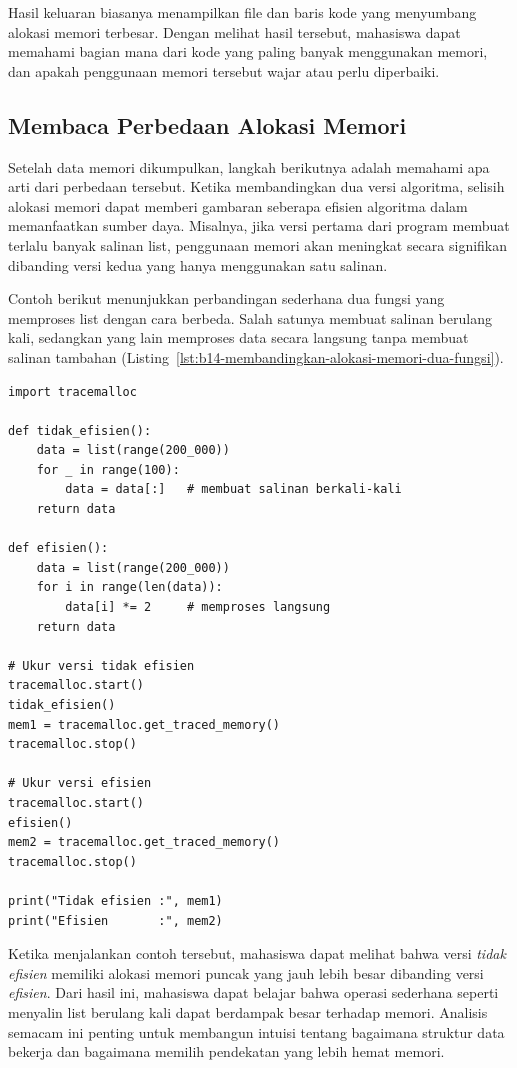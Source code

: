 Hasil keluaran biasanya menampilkan file dan baris kode yang menyumbang alokasi memori terbesar. Dengan melihat hasil tersebut, mahasiswa dapat memahami bagian mana dari kode yang paling banyak menggunakan memori, dan apakah penggunaan memori tersebut wajar atau perlu diperbaiki.

\subsection{Membaca Perbedaan Alokasi Memori}

Setelah data memori dikumpulkan, langkah berikutnya adalah memahami apa arti dari perbedaan tersebut. Ketika membandingkan dua versi algoritma, selisih alokasi memori dapat memberi gambaran seberapa efisien algoritma dalam memanfaatkan sumber daya. Misalnya, jika versi pertama dari program membuat terlalu banyak salinan list, penggunaan memori akan meningkat secara signifikan dibanding versi kedua yang hanya menggunakan satu salinan.

Contoh berikut menunjukkan perbandingan sederhana dua fungsi yang memproses list dengan cara berbeda. Salah satunya membuat salinan berulang kali, sedangkan yang lain memproses data secara langsung tanpa membuat salinan tambahan (Listing~\ref{lst:b14-membandingkan-alokasi-memori-dua-fungsi}).

\begin{lstlisting}[style=PythonStyle, caption={Membandingkan alokasi memori dua fungsi}, label={lst:b14-membandingkan-alokasi-memori-dua-fungsi}]
import tracemalloc

def tidak_efisien():
    data = list(range(200_000))
    for _ in range(100):
        data = data[:]   # membuat salinan berkali-kali
    return data

def efisien():
    data = list(range(200_000))
    for i in range(len(data)):
        data[i] *= 2     # memproses langsung
    return data

# Ukur versi tidak efisien
tracemalloc.start()
tidak_efisien()
mem1 = tracemalloc.get_traced_memory()
tracemalloc.stop()

# Ukur versi efisien
tracemalloc.start()
efisien()
mem2 = tracemalloc.get_traced_memory()
tracemalloc.stop()

print("Tidak efisien :", mem1)
print("Efisien       :", mem2)
\end{lstlisting}

Ketika menjalankan contoh tersebut, mahasiswa dapat melihat bahwa versi \textit{tidak efisien} memiliki alokasi memori puncak yang jauh lebih besar dibanding versi \textit{efisien}. Dari hasil ini, mahasiswa dapat belajar bahwa operasi sederhana seperti menyalin list berulang kali dapat berdampak besar terhadap memori. Analisis semacam ini penting untuk membangun intuisi tentang bagaimana struktur data bekerja dan bagaimana memilih pendekatan yang lebih hemat memori.

